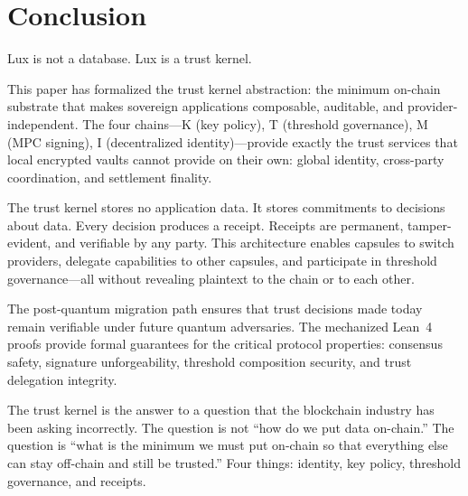\documentclass[11pt,a4paper]{article}
\begin{document}
\section{Conclusion}\label{sec:conclusion}

Lux is not a database. Lux is a trust kernel.

This paper has formalized the trust kernel abstraction: the minimum on-chain
substrate that makes sovereign applications composable, auditable, and
provider-independent. The four chains---K (key policy), T (threshold governance),
M (MPC signing), I (decentralized identity)---provide exactly the trust services
that local encrypted vaults cannot provide on their own: global identity,
cross-party coordination, and settlement finality.

The trust kernel stores no application data. It stores commitments to
decisions about data. Every decision produces a receipt. Receipts are
permanent, tamper-evident, and verifiable by any party. This architecture
enables capsules to switch providers, delegate capabilities to other capsules,
and participate in threshold governance---all without revealing plaintext to
the chain or to each other.

The post-quantum migration path ensures that trust decisions made today remain
verifiable under future quantum adversaries. The mechanized Lean~4 proofs
provide formal guarantees for the critical protocol properties: consensus
safety, signature unforgeability, threshold composition security, and trust
delegation integrity.

The trust kernel is the answer to a question that the blockchain industry has
been asking incorrectly. The question is not ``how do we put data on-chain.''
The question is ``what is the minimum we must put on-chain so that everything
else can stay off-chain and still be trusted.'' Four things: identity, key
policy, threshold governance, and receipts.

\end{document}

